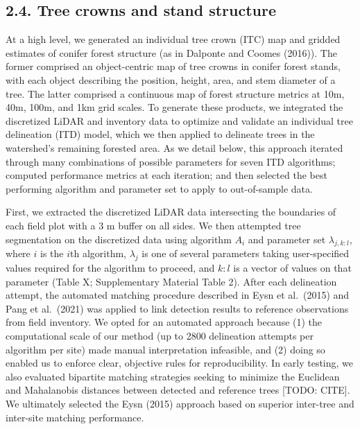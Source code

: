 \documentclass[
  12pt,
]{article}
\begin{document}
\subsection{2.4. Tree crowns and stand
structure}\label{tree-crowns-and-stand-structure}

At a high level, we generated an individual tree crown (ITC) map and
gridded estimates of conifer forest structure (as in Dalponte and Coomes
(2016)). The former comprised an object-centric map of tree crowns in
conifer forest stands, with each object describing the position, height,
area, and stem diameter of a tree. The latter comprised a continuous map
of forest structure metrics at 10m, 40m, 100m, and 1km grid scales. To
generate these products, we integrated the discretized LiDAR and
inventory data to optimize and validate an individual tree delineation
(ITD) model, which we then applied to delineate trees in the watershed's
remaining forested area. As we detail below, this approach iterated
through many combinations of possible parameters for seven ITD
algorithms; computed performance metrics at each iteration; and then
selected the best performing algorithm and parameter set to apply to
out-of-sample data.

First, we extracted the discretized LiDAR data intersecting the
boundaries of each field plot with a 3 m buffer on all sides. We then
attempted tree segmentation on the discretized data using algorithm
\(A_i\) and parameter set \(\lambda_{j,k:l}\), where \(i\) is the
\(i\)th algorithm, \(\lambda_j\) is one of several parameters taking
user-specified values required for the algorithm to proceed, and \(k:l\)
is a vector of values on that parameter (Table X; Supplementary Material
Table 2). After each delineation attempt, the automated matching
procedure described in Eysn et al.~(2015) and Pang et al.~(2021) was
applied to link detection results to reference observations from field
inventory. We opted for an automated approach because (1) the
computational scale of our method (up to 2800 delineation attempts per
algorithm per site) made manual interpretation infeasible, and (2) doing
so enabled us to enforce clear, objective rules for reproducibility. In
early testing, we also evaluated bipartite matching strategies seeking
to minimize the Euclidean and Mahalanobis distances between detected and
reference trees {[}TODO: CITE{]}. We ultimately selected the Eysn (2015)
approach based on superior inter-tree and inter-site matching
performance.
\end{document}
